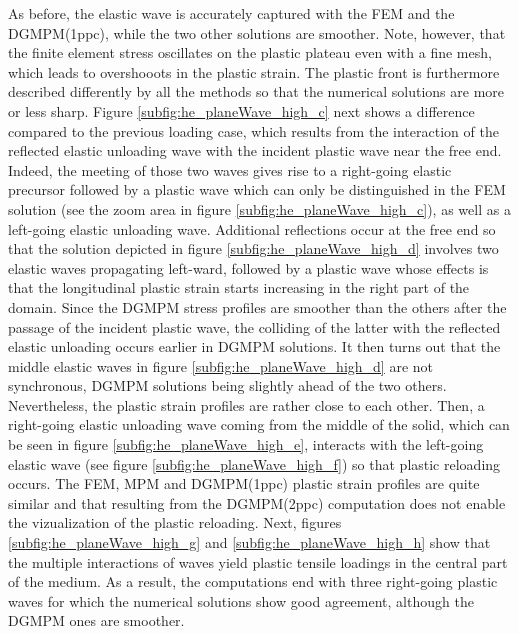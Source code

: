 As before, the elastic wave is accurately captured with the FEM and the DGMPM(1ppc), while the two other solutions are smoother.
Note, however, that the finite element stress oscillates on the plastic plateau even with a fine mesh, which leads to overshooots in the plastic strain.
The plastic front is furthermore described differently by all the methods so that the numerical solutions are more or less sharp. 
%
Figure \ref{subfig:he_planeWave_high_c} next shows a difference compared to the previous loading case, which results from the interaction of the reflected elastic unloading wave with the incident plastic wave near the free end.
Indeed, the meeting of those two waves gives rise to a right-going elastic precursor followed by a plastic wave which can only be distinguished in the FEM solution (see the zoom area in figure \ref{subfig:he_planeWave_high_c}), as well as a left-going elastic unloading wave.
Additional reflections occur at the free end so that the solution depicted in figure \ref{subfig:he_planeWave_high_d} involves two elastic waves propagating left-ward, followed by a plastic wave whose effects is that the longitudinal plastic strain starts increasing in the right part of the domain.
Since the DGMPM stress profiles are smoother than the others after the passage of the incident plastic wave, the colliding of the latter with the reflected elastic unloading occurs earlier in DGMPM solutions.
It then turns out that the middle elastic waves in figure \ref{subfig:he_planeWave_high_d} are not synchronous, DGMPM solutions being slightly ahead of the two others.
Nevertheless, the plastic strain profiles are rather close to each other.
%
Then, a right-going elastic unloading wave coming from the middle of the solid, which can be seen in figure \ref{subfig:he_planeWave_high_e}, interacts with the left-going elastic wave (see figure \ref{subfig:he_planeWave_high_f}) so that plastic reloading occurs.
The FEM, MPM and DGMPM(1ppc) plastic strain profiles are quite similar and that resulting from the DGMPM(2ppc) computation does not enable the vizualization of the plastic reloading.
Next, figures \ref{subfig:he_planeWave_high_g} and \ref{subfig:he_planeWave_high_h} show that the multiple interactions of waves yield plastic tensile loadings in the central part of the medium.
As a result, the computations end with three right-going plastic waves for which the numerical solutions show good agreement, although the DGMPM ones are smoother.

